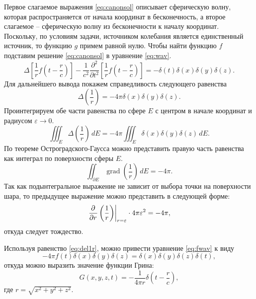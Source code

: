 \documentclass[a4paper, fontsize=14pt]{article}
\newcommand{\gradop}{\operatorname{grad}}
\begin{document}
Первое слагаемое выражения \eqref{eq:canonsol} описывает сферическую волну, которая распространяется от начала координат в бесконечность, а второе слагаемое -- сферическую волну из бесконечности к началу координат. Поскольку, по условиям задачи, источником колебания является единственный источник, то функцию $g$ примем равной нулю.  Чтобы найти функцию  $f$  подставим решение \eqref{eq:canonsol} в уравнение \eqref{eq:wav}. 
\begin{equation}
	\Delta \left[ \frac{1}{r}f\left(t-\frac{r}{c}\right) \right] - \frac{1}{c^2} \frac{\partial^2 }{\partial
		t^2}\left[ \frac{1}{r}f\left(t-\frac{r}{c}\right) \right]  = - \delta(t)\delta(x)\delta(y)\delta(z).
		\label{eq:fwav}
\end{equation}
Для дальнейшего вывода покажем справедливость следующего равенства \cite{morse}
	\begin{equation}
		\Delta\left(\frac{1}{r}\right) = -4\pi \delta(x)\delta(y)\delta(z).
		\label{eq:del1r}
	\end{equation}
Проинтегрируем обе части равенства по сфере $E$ с центром в начале координат и радиусом $\varepsilon \to 0$.
\begin{equation}
	\iiint_E \Delta\left(\frac{1}{r}\right) \, dE = -4\pi \iiint_E \delta(x)\delta(y)\delta(z) \, dE.
\end{equation}
По теореме Остроградского-Гаусса можно представить правую часть равенства как интеграл по поверхности сферы $E$.
\begin{equation}
	\iint_{\partial E} \gradop \left(\frac{1}{r}\right) \, dE = -4\pi.
\end{equation}
Так как подынтегральное выражение не зависит от выбора точки на поверхности шара, то предыдущее выражение можно представить в следующей форме:
\begin{equation}
	 \left.\frac{\partial ^ {  } }{\partial r ^ {  } }\left(\frac{1}{r}\right)\right|_{r=\varepsilon} \cdot 4\pi \varepsilon^2 = -4\pi,
\end{equation}	
откуда следует тождество.

Используя равенство \eqref{eq:del1r}, можно привести уравнение \eqref{eq:fwav}
к виду 
\begin{equation}
	-4\pi f(t) \delta(x) \delta(y) \delta(z)  = \delta(x) \delta(y) \delta(z) \delta(t),
\label{eq:fdel}	
\end{equation}
откуда можно выразить значение функции Грина:
\begin{equation}
	G(x,y,z,t) = -\frac{1}{4\pi r} \delta \left(t - \frac{r}{c}\right),
\label{eq:green3d0}	
\end{equation}  
где $r = \sqrt{x^2+y^2+z^2}$.
\end{document}
